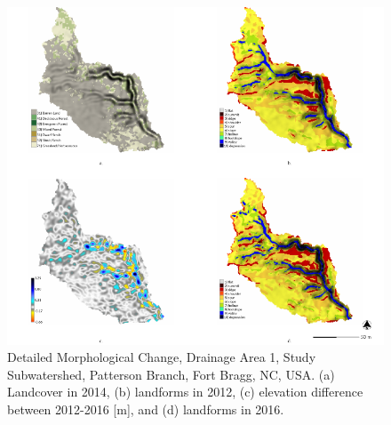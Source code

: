 \documentclass[gmd, manuscript]{copernicus}
\begin{document}
\begin{figure}
\center
\includegraphics[width=\textwidth,height=0.95\textheight,keepaspectratio]{figures/study_area_detail.pdf}
\caption{Detailed Morphological Change, Drainage Area 1, Study Subwatershed, Patterson Branch, Fort Bragg, NC, USA.
(a) Landcover in 2014, 
(b) landforms in 2012,
(c) elevation difference between 2012-2016 [m], and
(d) landforms in 2016.
}
\label{fig:study_area_detail}
\end{figure}

\end{document}
